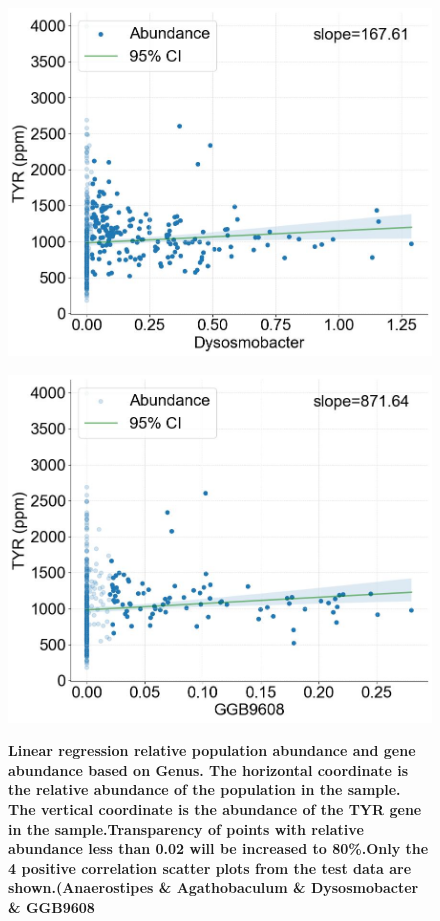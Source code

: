 \documentclass[12pt]{article}
\begin{document}
\begin{figure}[H]
    \vspace{1em} 
    
    \begin{minipage}{0.48\linewidth}
        \centering
        \includegraphics[width=\linewidth, height=0.8\linewidth]{pic/genus/genus3.jpg}
        \label{fig:image3}
    \end{minipage}
    \hfill
    \begin{minipage}{0.48\linewidth}
        \centering
        \includegraphics[width=\linewidth, height=0.8\linewidth]{pic/genus/genus4.jpg}
        \label{fig:image4}
    \end{minipage}

   \caption{\small\bfseries Linear regression relative population abundance and gene abundance based on Genus. The horizontal coordinate is the relative abundance of the population in the sample. The vertical coordinate is the abundance of the TYR gene in the sample.Transparency of points with relative abundance less than 0.02 will be increased to 80\%.Only the 4 positive correlation scatter plots from the test data are shown.(Anaerostipes \& Agathobaculum \& Dysosmobacter \& GGB9608}
\end{figure}
\end{document}
